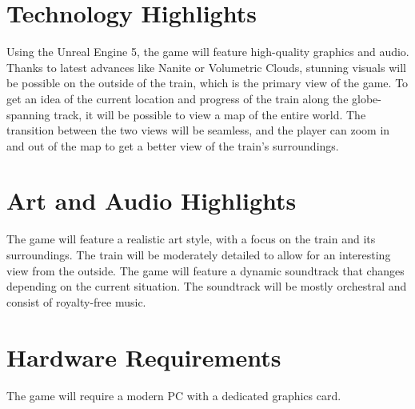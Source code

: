\section{Technology Highlights}

Using the Unreal Engine 5, the game will feature high-quality graphics and audio.
Thanks to latest advances like Nanite or Volumetric Clouds, stunning visuals will be possible on the outside of the train, which is the primary view of the game.
To get an idea of the current location and progress of the train along the globe-spanning track, it will be possible to view a map of the entire world.
The transition between the two views will be seamless, and the player can zoom in and out of the map to get a better view of the train's surroundings.

\section{Art and Audio Highlights}

The game will feature a realistic art style, with a focus on the train and its surroundings.
The train will be moderately detailed to allow for an interesting view from the outside.
The game will feature a dynamic soundtrack that changes depending on the current situation.
The soundtrack will be mostly orchestral and consist of royalty-free music.

\section{Hardware Requirements}

The game will require a modern PC with a dedicated graphics card.
